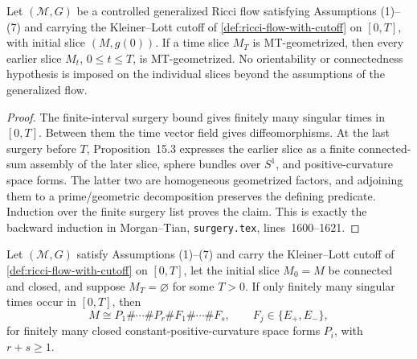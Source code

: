 \begin{theorem}
\label{thm:morgan-tian-corollary-15-4-general}
\notready
Let $({\mathcal M},G)$ be a controlled generalized Ricci flow satisfying
Assumptions (1)--(7) and carrying the Kleiner--Lott cutoff of
\ref{def:ricci-flow-with-cutoff} on $[0,T]$, with initial slice $(M,g(0))$.
If a time slice $M_T$ is
MT-geometrized, then every earlier slice $M_t$, $0\le t\le T$, is
MT-geometrized.  No orientability or connectedness hypothesis is imposed on
the individual slices beyond the assumptions of the generalized flow.
\end{theorem}

\begin{proof}
The finite-interval surgery bound gives finitely many singular times in
$[0,T]$.  Between them the time vector field gives diffeomorphisms.  At the
last surgery before $T$, Proposition~15.3 expresses the earlier slice as a
finite connected-sum assembly of the later slice, sphere bundles over $S^1$,
and positive-curvature space forms.  The latter two are homogeneous
geometrized factors, and adjoining them to a prime/geometric decomposition
preserves the defining predicate.  Induction over the finite surgery list
proves the claim.  This is exactly the backward induction in
Morgan--Tian, \texttt{surgery.tex}, lines~1600--1621.
\end{proof}

\begin{theorem}
\label{thm:morgan-tian-corollary-15-4-empty-general}
\notready
Let $({\mathcal M},G)$ satisfy Assumptions (1)--(7) and carry the
Kleiner--Lott cutoff of \ref{def:ricci-flow-with-cutoff} on $[0,T]$, let the initial slice
$M_0=M$ be connected and closed, and suppose $M_T=\varnothing$ for some
$T>0$.  If only finitely many singular times occur in $[0,T]$, then
\[
 M\cong P_1\#\cdots\#P_r\#F_1\#\cdots\#F_s,
 \qquad F_j\in\{E_+,E_-\},
\]
for finitely many closed constant-positive-curvature space forms $P_i$, with
$r+s\ge1$.
\end{theorem}

